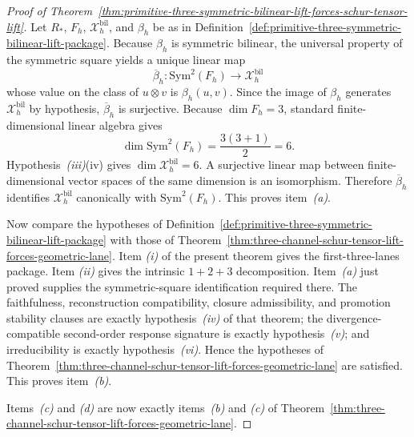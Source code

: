 \begin{proof}[Proof of Theorem~\ref{thm:primitive-three-symmetric-bilinear-lift-forces-schur-tensor-lift}]
\label{proof:thm:primitive-three-symmetric-bilinear-lift-forces-schur-tensor-lift}
Let \(R_\ast\), \(F_h\), \(\mathcal X_h^{\mathrm{bil}}\), and \(\beta_h\) be
as in
Definition~\ref{def:primitive-three-symmetric-bilinear-lift-package}. Because
\(\beta_h\) is symmetric bilinear, the universal property of the symmetric
square yields a unique linear map
\[
\overline{\beta}_h:\mathrm{Sym}^2(F_h)\to \mathcal X_h^{\mathrm{bil}}
\]
whose value on the class of \(u\otimes v\) is \(\beta_h(u,v)\). Since the image
of \(\beta_h\) generates \(\mathcal X_h^{\mathrm{bil}}\) by hypothesis,
\(\overline{\beta}_h\) is surjective. Because \(\dim F_h=3\), standard
finite-dimensional linear algebra gives
\[
\dim \mathrm{Sym}^2(F_h)=\frac{3(3+1)}2=6.
\]
Hypothesis~\emph{(iii)}(iv) gives \(\dim \mathcal X_h^{\mathrm{bil}}=6\). A
surjective linear map between finite-dimensional vector spaces of the same
dimension is an isomorphism. Therefore \(\overline{\beta}_h\) identifies
\(\mathcal X_h^{\mathrm{bil}}\) canonically with \(\mathrm{Sym}^2(F_h)\).
This proves item~\emph{(a)}.

Now compare the hypotheses of
Definition~\ref{def:primitive-three-symmetric-bilinear-lift-package} with
those of
Theorem~\ref{thm:three-channel-schur-tensor-lift-forces-geometric-lane}. Item
\emph{(i)} of the present theorem gives the first-three-lanes package. Item
\emph{(ii)} gives the intrinsic \(1+2+3\) decomposition. Item~\emph{(a)} just
proved supplies the symmetric-square identification required there. The
faithfulness, reconstruction compatibility, closure admissibility, and
promotion stability clauses are exactly hypothesis~\emph{(iv)} of that
theorem; the divergence-compatible second-order response signature is exactly
hypothesis~\emph{(v)}; and irreducibility is exactly hypothesis~\emph{(vi)}.
Hence the hypotheses of
Theorem~\ref{thm:three-channel-schur-tensor-lift-forces-geometric-lane} are
satisfied. This proves item~\emph{(b)}.

Items~\emph{(c)} and \emph{(d)} are now exactly items~\emph{(b)} and
\emph{(c)} of
Theorem~\ref{thm:three-channel-schur-tensor-lift-forces-geometric-lane}.
\end{proof}

